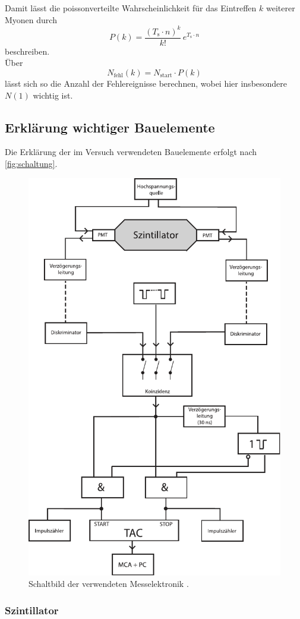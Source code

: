 Damit lässt die poissonverteilte Wahrscheinlichkeit für das Eintreffen $k$ weiterer Myonen durch
\begin{equation*}
    P(k) = \frac{(T_\text{s} \cdot n)^k}{k!} \, e^{T_\text{s} \cdot n}
\end{equation*}
beschreiben. \\

Über
\begin{equation*}
    N_\text{fehl} (k) = N_\text{start} \cdot P(k)
\end{equation*}
lässt sich so die Anzahl der Fehlereignisse berechnen, wobei hier insbesondere $N(1)$ wichtig ist.

\newpage

\subsection{Erklärung wichtiger Bauelemente}

Die Erklärung der im Versuch verwendeten Bauelemente erfolgt nach \autoref{fig:schaltung}.

\begin{figure}
    \centering
    \includegraphics[width=.6\textwidth]{figures/V01.pdf}
    \caption{Schaltbild der verwendeten Messelektronik \cite{ap03}.}
    \label{fig:schaltung}
\end{figure}

\subsubsection{Szintillator}


